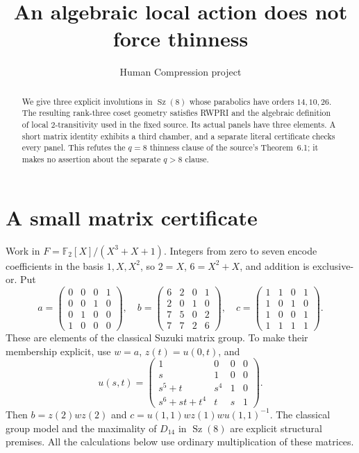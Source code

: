 \documentclass[11pt,a4paper]{article}
\title{An algebraic local action does not force thinness}
\author{Human Compression project}\date{}
\newcommand{\Sz}{\operatorname{Sz}}
\begin{document}
\maketitle
\begin{abstract}
We give three explicit involutions in $\Sz(8)$ whose parabolics have
orders $14,10,26$. The resulting rank-three coset geometry satisfies
RWPRI and the algebraic definition of local $2$-transitivity used in
the fixed source. Its actual panels have three elements. A short matrix
identity exhibits a third chamber, and a separate literal certificate
checks every panel. This refutes the $q=8$ thinness clause of the source's
Theorem~6.1; it makes no assertion about the separate $q>8$ clause.
\end{abstract}
\section{A small matrix certificate}
Work in $F=\mathbb F_2[X]/(X^3+X+1)$. Integers from zero to seven encode
coefficients in the basis $1,X,X^2$, so $2=X$, $6=X^2+X$, and
addition is exclusive-or. Put
\[
 a=\begin{pmatrix}0&0&0&1\\0&0&1&0\\0&1&0&0\\1&0&0&0\end{pmatrix},\quad
 b=\begin{pmatrix}6&2&0&1\\2&0&1&0\\7&5&0&2\\7&7&2&6\end{pmatrix},\quad
 c=\begin{pmatrix}1&1&0&1\\1&0&1&0\\1&0&0&1\\1&1&1&1\end{pmatrix}.
\]
These are elements of the classical Suzuki matrix group. To make their
membership explicit, use $w=a$, $z(t)=u(0,t)$, and
\[
u(s,t)=\begin{pmatrix}
1&0&0&0\\s&1&0&0\\s^5+t&s^4&1&0\\s^6+st+t^4&t&s&1
\end{pmatrix}.
\]
Then $b=z(2)wz(2)$ and
$c=u(1,1)wz(1)wu(1,1)^{-1}$. The classical group model and the
maximality of $D_{14}$ in $\Sz(8)$ are explicit structural premises.
All the calculations below use ordinary multiplication of these matrices.
\end{document}
